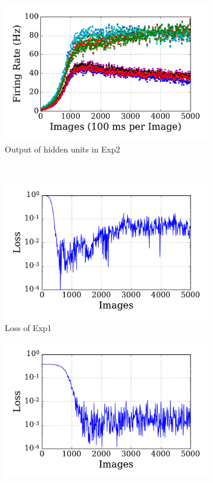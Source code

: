 \begin{figure}
\begin{subfigure}[t]{0.48\textwidth}
		\includegraphics[width=\textwidth]{pics_sdlm/11_exp_SRBM_Orig_long/exp2_hid_s.pdf}
		\caption{Output of hidden units in Exp2}
	\end{subfigure}\\
	\begin{subfigure}[t]{0.48\textwidth}
		\includegraphics[width=\textwidth]{pics_sdlm/11_exp_SRBM_Orig_long/exp1_mse_nons.pdf}
		\caption{Loss of Exp1}
	\end{subfigure}
	\begin{subfigure}[t]{0.48\textwidth}
		\includegraphics[width=\textwidth]{pics_sdlm/11_exp_SRBM_Orig_long/exp2_mse_nons.pdf}

\end{subfigure}
\end{figure}
